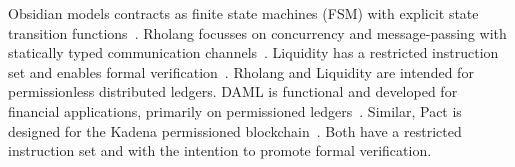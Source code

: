 Obsidian models contracts as finite state machines (FSM) with explicit state transition functions~\cite{Coblenz2017}.
Rholang focusses on concurrency and message-passing with statically typed communication channels~\cite{Meredith2018}.
Liquidity has a restricted instruction set and enables formal verification~\cite{OCamlProSAS2018}.
Rholang and Liquidity are intended for permissionless distributed ledgers.
DAML is functional and developed for financial applications, primarily on permissioned ledgers~\cite{Meier2018,Lippmeier2018}.
Similar, Pact is designed for the Kadena permissioned blockchain~\cite{Popejoy2017}.
Both have a restricted instruction set and with the intention to promote formal verification.


